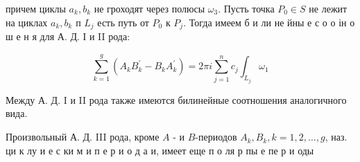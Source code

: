 \documentclass[10pt]{article}
\begin{document}
причем циклы $a_{k}, b_{k}$ не гроходят через полюсы $\omega_{3}$. Пусть точка $P_{0} \in S$ не лежит на циклах $a_{k}, b_{k}$ п $L_{j}$ есть путь от $P_{0}$ к $P_{j}$. Тогда имеем б и ли не йны е с о о ін о ш е н я для А. Д. І и II рода:

\[
\sum_{k=1}^{g}\left(A_{k} B_{k}^{\prime}-B_{k} A_{k}^{\prime}\right)=2 \pi i \sum_{j=1}^{n} c_{j} \int_{L_{j}} \omega_{1}
\]

Между А. Д. I и II рода также имеются билинейные соотношения аналогичного вида.

Произвольный А. Д. III рода, кроме $A$ - и $B$-периодов $A_{k}, B_{k}, k=1,2, \ldots, g$, наз. ци к лу и е с ки м и п е р и о д а и, имеет еще п о ля р пы е пе р и оды
\end{document}
